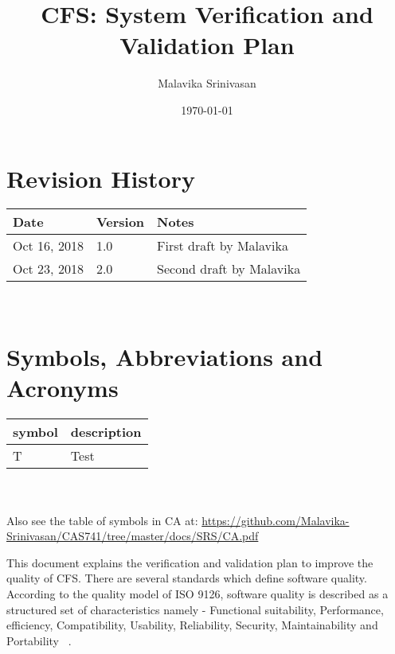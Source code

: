 \documentclass[12pt, titlepage]{article}
\newcommand{\famname}{CFS} %
\begin{document}
\title{CFS: System Verification and Validation Plan} 
\author{Malavika Srinivasan}
\date{\today}
	
\maketitle



\section{Revision History}

\begin{tabularx}{\textwidth}{p{3cm}p{2cm}X}
\toprule {\bf Date} & {\bf Version} & {\bf Notes}\\
\midrule
Oct 16, 2018 & 1.0 & First draft by Malavika\\
Oct 23, 2018 & 2.0 & Second draft by Malavika\\

\bottomrule
\end{tabularx}

~\newpage

\section{Symbols, Abbreviations and Acronyms}

\renewcommand{\arraystretch}{1.2}
\begin{tabular}{l l} 
  \toprule		
  \textbf{symbol} & \textbf{description}\\
  \midrule 
  T & Test\\
  \bottomrule
\end{tabular}\\
\\
Also see the table of symbols in CA at: \url{https://github.com/Malavika-Srinivasan/CAS741/tree/master/docs/SRS/CA.pdf}\\


\newpage

\tableofcontents

\listoftables

\listoffigures

\newpage



This document explains the verification and validation plan to improve the quality of \famname{}. There are several standards which define software quality. According to the quality model of ISO 9126,  software quality is described as a structured set of characteristics namely - Functional suitability, Performance, efficiency, Compatibility, Usability,  Reliability, Security, Maintainability and Portability ~\cite{ISO9126}.
\end{document}
